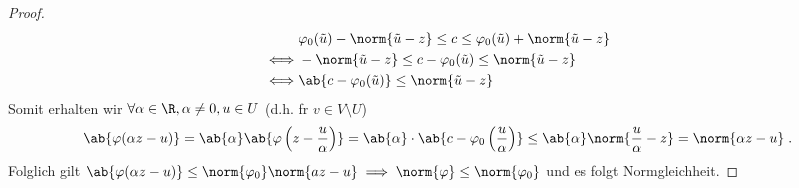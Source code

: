 \begin{proof}
			\begin{align*}
			& \varphi_0(\tilde u) - \norm{\tilde u - z} \leq c \leq \varphi_0 (\tilde u) + \norm{\tilde u -z} \\
			\iff & 	- \norm{\tilde u - z} \leq c - \varphi_0 (\tilde u) \leq \norm{\tilde u -z}	
			\\
			\iff & \ab{c-\varphi_0(\tilde u)} \leq \norm{\tilde u -z}
			\end{align*}
			Somit erhalten wir \(\forall \alpha \in \R, \alpha \neq 0, u \in U\) (d.h. f\us r \(v\in V\setminus U\))
			\[\ab{\varphi(\alpha z -u)} = \ab{\alpha} \ab{\varphi\left(z - \frac{u}{\alpha}\right)} = \ab{\alpha} \cdot \ab{c - \varphi_0\left(\frac{u}{\alpha}\right)} \leq \ab{\alpha}\norm{\frac{u}{\alpha}-z} = \norm{\alpha z -u}\;.\]
			Folglich gilt 
			\(\ab{\varphi(\alpha z -u)} \leq \norm{\varphi_0} \norm{az - u}\implies \norm{\varphi} \leq \norm{\varphi_0}\) und es folgt Normgleichheit.
	\end{proof}
	
